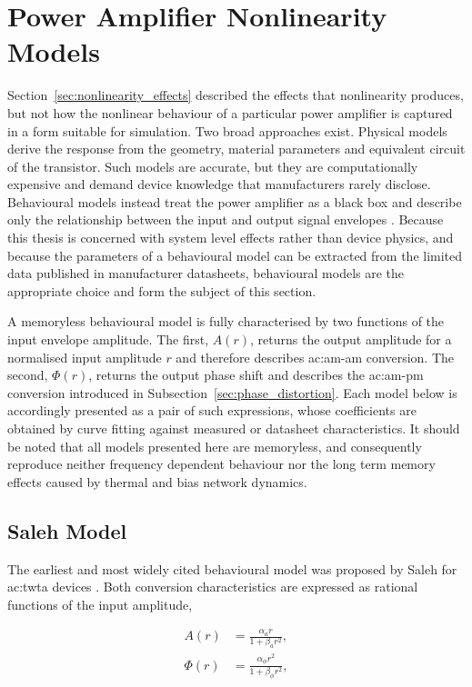 \section{Power Amplifier Nonlinearity Models}\label{sec:pa_models}

Section~\ref{sec:nonlinearity_effects} described the effects that nonlinearity produces, but not how the nonlinear behaviour of a particular power amplifier is captured in a form suitable for simulation. Two broad approaches exist. Physical models derive the response from the geometry, material parameters and equivalent circuit of the transistor. Such models are accurate, but they are computationally expensive and demand device knowledge that manufacturers rarely disclose. Behavioural models instead treat the power amplifier as a black box and describe only the relationship between the input and output signal envelopes \cite{schreurs}. Because this thesis is concerned with system level effects rather than device physics, and because the parameters of a behavioural model can be extracted from the limited data published in manufacturer datasheets, behavioural models are the appropriate choice and form the subject of this section.

A memoryless behavioural model is fully characterised by two functions of the input envelope amplitude. The first, $A(r)$, returns the output amplitude for a normalised input amplitude $r$ and therefore describes \gls{ac:am-am} conversion. The second, $\Phi(r)$, returns the output phase shift and describes the \gls{ac:am-pm} conversion introduced in Subsection~\ref{sec:phase_distortion}. Each model below is accordingly presented as a pair of such expressions, whose coefficients are obtained by curve fitting against measured or datasheet characteristics. It should be noted that all models presented here are memoryless, and consequently reproduce neither frequency dependent behaviour nor the long term memory effects caused by thermal and bias network dynamics.

\subsection{Saleh Model}\label{sec:saleh_model}

The earliest and most widely cited behavioural model was proposed by Saleh for \gls{ac:twta} devices \cite{saleh}. Both conversion characteristics are expressed as rational functions of the input amplitude,

\begin{align}
  A(r)    &= \frac{\alpha_a r}{1 + \beta_a r^2},        \label{eq:saleh_amam} \\
  \Phi(r) &= \frac{\alpha_\phi r^2}{1 + \beta_\phi r^2}, \label{eq:saleh_ampm}
\end{align}

